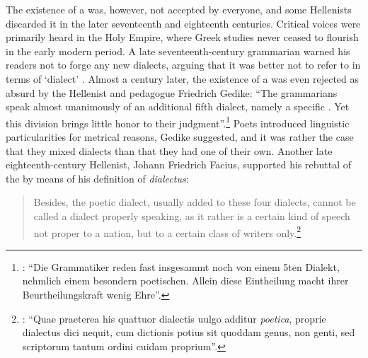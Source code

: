 The existence of a  was, however, not accepted by everyone, and some Hellenists discarded it in the later seventeenth and eighteenth centuries. Critical voices were primarily heard in the Holy  Empire, where Greek studies never ceased to flourish in the early modern period. A late seven\-teenth-century grammarian warned his readers not to forge any new dialects, arguing that it was better not to refer to  in terms of ‘dialect’ \citep[512]{Ursin1691}. Almost a century later, the existence of a  was even rejected as absurd by the  Hellenist and pedagogue Friedrich Gedike: “The grammarians speak almost unanimously of an additional fifth dialect, namely a specific . Yet this division brings little honor to their judgment”.\footnote{\citet[21]{Gedike1782}: “Die Grammatiker reden fast insgesammt noch von einem 5ten Dialekt, nehmlich einem besondern poetischen. Allein diese Eintheilung macht ihrer Beurtheilungskraft wenig Ehre”.} Poets introduced linguistic particularities for metrical reasons, Gedike suggested, and it was rather the case that they mixed dialects than that they had one of their own. Another late eighteenth-century  Hellenist, Johann Friedrich Facius, supported his rebuttal of the  by means of his definition of \textit{dialectus}:

\begin{quote}
Besides, the poetic dialect, usually added to these four dialects, cannot be called a dialect properly speaking, as it rather is a certain kind of speech not proper to a nation, but to a certain class of writers only.\footnote{\citet[\textsc{v}]{Facius1782}: “Quae praeterea his quattuor dialectis uulgo additur \textit{poetica}, proprie dialectus dici nequit, cum dictionis potius sit quoddam genus, non genti, sed scriptorum tantum ordini cuidam proprium”.}
\end{quote}

